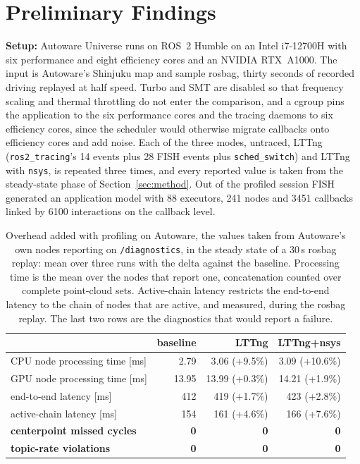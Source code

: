 \section{Preliminary Findings}
\label{sec:findings}

\noindent
\textbf{Setup:}
Autoware Universe runs on ROS~2 Humble on an Intel i7-12700H with six
performance and eight efficiency cores and an NVIDIA RTX~A1000. The input is
Autoware's Shinjuku map and sample rosbag, thirty seconds of recorded driving
replayed at half speed. Turbo and SMT are disabled so that frequency scaling and
thermal throttling do not enter the comparison, and a cgroup pins the
application to the six performance cores and the tracing daemons to six
efficiency cores, since the scheduler would otherwise migrate callbacks onto
efficiency cores and add noise. Each of the three modes, untraced, LTTng
(\texttt{ros2\_tracing}'s 14 events plus 28 FISH events plus
\texttt{sched\_switch}) and LTTng with \texttt{nsys}, is repeated three times,
and every reported value is taken from the steady-state phase of
Section~\ref{sec:method}. Out of the profiled session FISH generated an
application model with 88 executors, 241 nodes and 3451 callbacks linked by
6100 interactions on the callback level.

\begin{table}[t]
\centering
\footnotesize
\caption{Overhead added with profiling on Autoware, the values taken from
Autoware's own nodes reporting on \texttt{/diagnostics}, in the steady state of
a 30\,s rosbag replay: mean over three runs with the delta against the
baseline. Processing time is the mean over the nodes that report one,
concatenation counted over complete point-cloud sets. Active-chain latency
restricts the end-to-end latency to the chain of nodes that are active, and
measured, during the rosbag replay. The last two rows are the diagnostics that
would report a failure.}
\label{tab:overhead-aw}
\begin{tabular}{@{}lrrr@{}}
\hline
 & baseline & LTTng & LTTng+nsys \\ \hline
CPU node processing time [ms] &  2.79 &  3.06 (+9.5\%)  &  3.09 (+10.6\%) \\
GPU node processing time [ms] & 13.95 & 13.99 (+0.3\%)  & 14.21 (+1.9\%)  \\
end-to-end latency [ms]       &   412 &   419 (+1.7\%)  &   423 (+2.8\%)  \\
active-chain latency [ms]     &   154 &   161 (+4.6\%)  &   166 (+7.6\%)  \\
\textbf{centerpoint missed cycles} & \textbf{0} & \textbf{0} & \textbf{0} \\
\textbf{topic-rate violations}     & \textbf{0} & \textbf{0} & \textbf{0} \\ \hline
\end{tabular}
\end{table}

